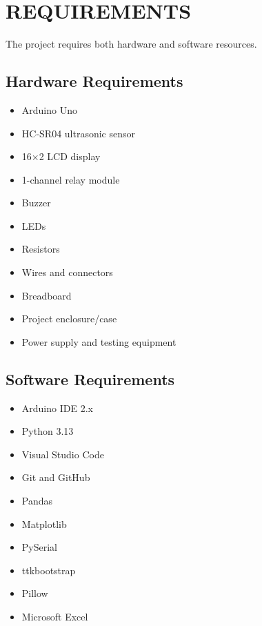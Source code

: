 \documentclass[12pt,a4paper]{article}
\begin{document}

\section{REQUIREMENTS}

The project requires both hardware and software resources.

\subsection{Hardware Requirements}

\begin{itemize}
    \item Arduino Uno
    \item HC-SR04 ultrasonic sensor
    \item 16$\times$2 LCD display
    \item 1-channel relay module
    \item Buzzer
    \item LEDs
    \item Resistors
    \item Wires and connectors
    \item Breadboard
    \item Project enclosure/case
    \item Power supply and testing equipment
\end{itemize}

\subsection{Software Requirements}

\begin{itemize}
    \item Arduino IDE 2.x
    \item Python 3.13
    \item Visual Studio Code
    \item Git and GitHub
    \item Pandas
    \item Matplotlib
    \item PySerial
    \item ttkbootstrap
    \item Pillow
    \item Microsoft Excel
\end{itemize}
\end{document}
